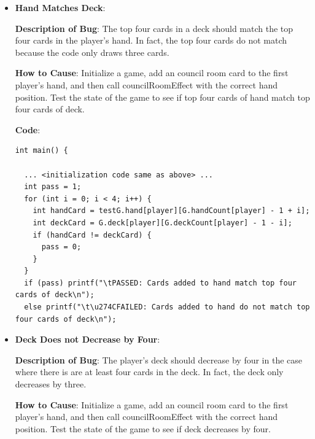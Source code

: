 \documentclass[11pt,letterpaper]{article}
\begin{document}
\begin{enumerate}[label=\Roman*.]
\begin{enumerate}
\begin{itemize}[leftmargin=*]
\begin{lstlisting}
  memcpy(&testG, &G, sizeof(struct gameState)); 
  councilRoomEffect(&testG, player, handpos);   

  int oldCount = G.handCount[player];
  int newCount = testG.handCount[player];
  if (oldCount + X == newCount) printf("\tPASSED: For Player %d, HandCount increased by %d\n", player, X); 
  else printf("\t\u274CFAILED: For Player %d, expected handcount to increase by %d, but increased by %d\n", player, X, newCount - oldCount);

          \end{lstlisting}

        \item \textbf{Hand Matches Deck}:

        \textbf{Description of Bug}: The top four cards in a deck should match the
            top four cards in the player's hand. In fact, the top four cards do not
            match because the code only draws three cards.

        \textbf{How to Cause}: Initialize a game, add an council room card to 
          the first player's hand, and then call councilRoomEffect with the correct
          hand position. Test the state of the game to see if top four cards of hand
            match top four cards of deck.

        \textbf{Code}:

          \begin{lstlisting}
int main() {
  
  ... <initialization code same as above> ...
  int pass = 1;
  for (int i = 0; i < 4; i++) {
    int handCard = testG.hand[player][G.handCount[player] - 1 + i];
    int deckCard = G.deck[player][G.deckCount[player] - 1 - i];
    if (handCard != deckCard) {
      pass = 0;
    }
  }
  if (pass) printf("\tPASSED: Cards added to hand match top four cards of deck\n");
  else printf("\t\u274CFAILED: Cards added to hand do not match top four cards of deck\n");

          \end{lstlisting}

        \item \textbf{Deck Does not Decrease by Four}:

        \textbf{Description of Bug}: The player's deck should decrease by four in the case
        where there is are at least four cards in the deck. In fact, the deck only decreases
        by three.

        \textbf{How to Cause}: Initialize a game, add an council room card to 
          the first player's hand, and then call councilRoomEffect with the correct
          hand position. Test the state of the game to see if deck decreases by four.


\end{itemize}
\end{enumerate}
\end{enumerate}
\end{document}
